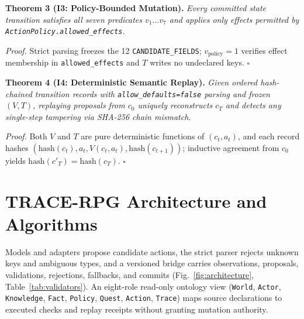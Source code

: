 \noindent\textbf{Theorem 3 (I3: Policy-Bounded Mutation).} \emph{Every committed state transition satisfies all seven predicates $v_1\dots v_7$ and applies only effects permitted by \texttt{ActionPolicy.}\allowbreak\texttt{allowed\_}\allowbreak\texttt{effects}.}
\par\noindent\textit{Proof.} Strict parsing freezes the 12 \texttt{CANDIDATE\_}\allowbreak\texttt{FIELDS}; $v_{\mathrm{policy}}{=}1$ verifies effect membership in \texttt{allowed\_}\allowbreak\texttt{effects} and $T$ writes no undeclared keys. \hfill$\square$

\noindent\textbf{Theorem 4 (I4: Deterministic Semantic Replay).} \emph{Given ordered hash-chained transition records with \texttt{allow\_}\allowbreak\texttt{defaults=false} parsing and frozen $(V,T)$, replaying proposals from $c_0$ uniquely reconstructs $c_T$ and detects any single-step tampering via SHA-256 chain mismatch.}
\par\noindent\textit{Proof.} Both $V$ and $T$ are pure deterministic functions of $(c_t,a_t)$, and each record hashes $(\mathrm{hash}(c_t),\allowbreak a_t,\allowbreak V(c_t,a_t),\allowbreak\mathrm{hash}(c_{t+1}))$; inductive agreement from $c_0$ yields $\mathrm{hash}(c'_T)=\mathrm{hash}(c_T)$. \hfill$\square$

\section{TRACE-RPG Architecture and Algorithms}\label{sec:arch}
Models and adapters propose candidate actions, the strict parser rejects unknown keys and ambiguous types, and a versioned bridge carries observations, proposals, validations, rejections, fallbacks, and commits (Fig.~\ref{fig:architecture}, Table~\ref{tab:validators}). An eight-role read-only ontology view (\texttt{World}, \texttt{Actor}, \texttt{Knowledge}, \texttt{Fact}, \texttt{Policy}, \texttt{Quest}, \texttt{Action}, \texttt{Trace}) maps source declarations to executed checks and replay receipts without granting mutation authority.

